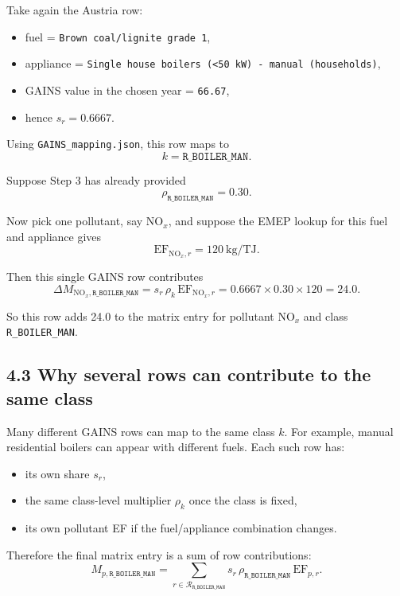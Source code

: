 \documentclass[11pt,a4paper]{article}
\begin{document}
Take again the Austria row:

\begin{itemize}[leftmargin=1.4em]
  \item fuel = \texttt{Brown coal/lignite grade 1},
  \item appliance = \texttt{Single house boilers (<50 kW) - manual (households)},
  \item GAINS value in the chosen year = \texttt{66.67},
  \item hence $s_r = 0.6667$.
\end{itemize}

Using \texttt{GAINS\_mapping.json}, this row maps to
\[
k = \texttt{R\_BOILER\_MAN}.
\]

Suppose Step 3 has already provided
\[
\rho_{\texttt{R\_BOILER\_MAN}} = 0.30.
\]

Now pick one pollutant, say NO$_x$, and suppose the EMEP lookup for this fuel and
appliance gives
\[
\mathrm{EF}_{\text{NO}_x,r} = 120 \ \mathrm{kg/TJ}.
\]

Then this single GAINS row contributes
\[
\Delta M_{\text{NO}_x,\texttt{R\_BOILER\_MAN}}
= s_r \, \rho_k \, \mathrm{EF}_{\text{NO}_x,r}
= 0.6667 \times 0.30 \times 120
= 24.0.
\]

So this row adds 24.0 to the matrix entry for pollutant NO$_x$ and class
\texttt{R\_BOILER\_MAN}.

\subsection{4.3 Why several rows can contribute to the same class}

Many different GAINS rows can map to the same class $k$. For example, manual
residential boilers can appear with different fuels. Each such row has:

\begin{itemize}[leftmargin=1.4em]
  \item its own share $s_r$,
  \item the same class-level multiplier $\rho_k$ once the class is fixed,
  \item its own pollutant EF if the fuel/appliance combination changes.
\end{itemize}

Therefore the final matrix entry is a sum of row contributions:
\[
M_{p,\texttt{R\_BOILER\_MAN}}
= \sum_{r \in \mathcal{R}_{\texttt{R\_BOILER\_MAN}}}
s_r \, \rho_{\texttt{R\_BOILER\_MAN}} \, \mathrm{EF}_{p,r}.
\]
\end{document}
